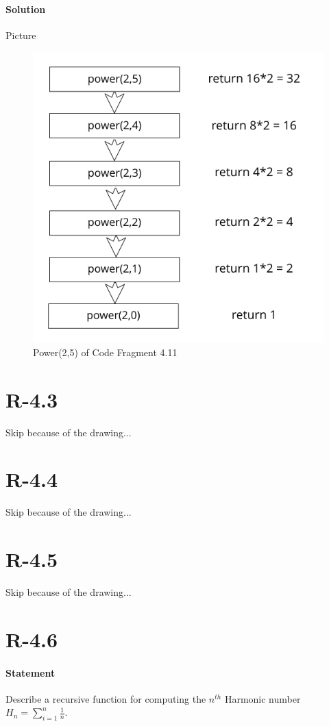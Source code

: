 \documentclass{article}
\begin{document}
\paragraph{Solution} Picture
\begin{figure}[h!]
  \includegraphics[width=\linewidth]{Drawing.png}
  \caption{Power(2,5) of Code Fragment 4.11}
  \label{fig:Power(2,5)}
\end{figure}


\section{R-4.3}
  Skip because of the drawing...
\section{R-4.4}
  Skip because of the drawing...
\section{R-4.5}
  Skip because of the drawing...
\section{R-4.6}
  \paragraph{Statement}
  Describe a recursive function for computing the $n^{th}$ Harmonic number $H_{n}=\sum_{i=1}^{n}{\frac{1}{n}}$.
\end{document}
